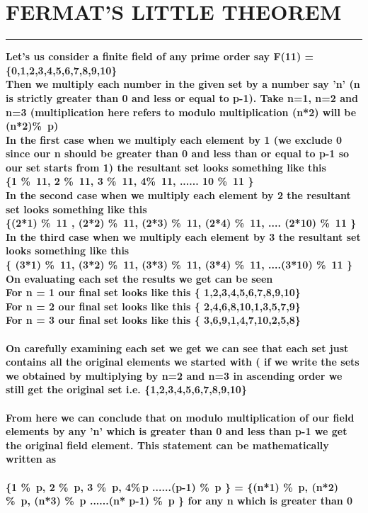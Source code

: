 \documentclass{article}
\begin{document}
\section * {FERMAT'S LITTLE THEOREM}
\hrule 
\bigskip
\textbf{Let's us consider  a finite field of any prime order say  F(11) = \{0,1,2,3,4,5,6,7,8,9,10\} \\
Then we  multiply each number in the given set by a number say 'n' (n is strictly greater than  0 and less or equal to p-1). Take  n=1, n=2 and n=3 (multiplication here refers to modulo multiplication (n*2) will be (n*2)\%\ p) 
\\ In the first case when we multiply each element by 1 (we exclude 0 since our n should be greater than 0 and less than or equal to p-1 so our set starts from 1) the resultant set looks something like this \\
\{1 \%\ 11, 2 \%\ 11, 3 \%\ 11, 4\%\ 11, ...... 10 \%\ 11 \}
\\
In the second case when we multiply each element by 2 the resultant set looks something like this \\ 
\{(2*1) \%\ 11 , (2*2) \%\ 11, (2*3) \%\ 11, (2*4) \%\ 11, .... (2*10) \%\ 11 \} 
\\
In the third case when we multiply each element by 3 the resultant set looks something like this \\ 
\{ (3*1) \%\ 11, (3*2) \%\ 11, (3*3) \%\ 11, (3*4) \%\ 11, ....(3*10) \%\ 11 \} 
\\
On evaluating each set the results we get can be seen \\
For n = 1 our final set looks like this \{ 1,2,3,4,5,6,7,8,9,10\} \\ 
For n = 2 our final set looks like this \{
2,4,6,8,10,1,3,5,7,9\} \\
For n = 3 our final set looks like this \{
3,6,9,1,4,7,10,2,5,8\} \\
\\
On carefully examining each set we get we can see that each set just contains all the original elements we started with ( if we write the sets we obtained by multiplying by n=2 and n=3 in ascending order we still get the original set i.e. \{1,2,3,4,5,6,7,8,9,10\} 
\\
\\
From here we can conclude that on modulo multiplication of our field elements by any 'n' which is greater than 0 and less than p-1  we get the original field element. This statement can be mathematically written as \\ \\
\{1 \%\ p, 2 \%\ p, 3 \%\ p, 4\%\,p ......(p-1) \%\ p \} = \{(n*1) \%\ p, (n*2) \%\ p, (n*3) \%\ p ......(n* p-1) \%\ p \} for any n which is greater than 0 
\\
}
\pagebreak
\end{document}
